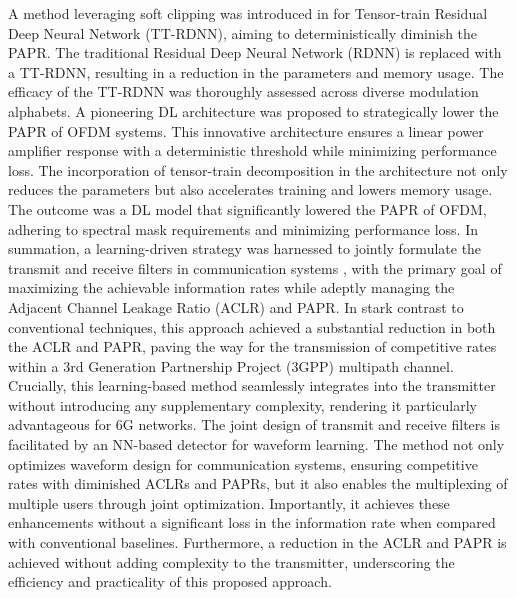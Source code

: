 \documentclass[conference]{IEEEtran}
\begin{document}
A method leveraging soft clipping was introduced in \cite{b153} for Tensor-train Residual Deep Neural Network (TT-RDNN), aiming to deterministically diminish the PAPR. The traditional Residual Deep Neural Network (RDNN) is replaced with a TT-RDNN, resulting in a reduction in the parameters and memory usage. The efficacy of the TT-RDNN was thoroughly assessed across diverse modulation alphabets. A pioneering DL architecture was proposed to strategically lower the PAPR of OFDM systems. This innovative architecture ensures a linear power amplifier response with a deterministic threshold while minimizing performance loss. The incorporation of tensor-train decomposition in the architecture not only reduces the parameters but also accelerates training and lowers memory usage. The outcome was a DL model that significantly lowered the PAPR of OFDM, adhering to spectral mask requirements and minimizing performance loss. In summation, a learning-driven strategy was harnessed to jointly formulate the transmit and receive filters in communication systems \cite{b154}, with the primary goal of maximizing the achievable information rates while adeptly managing the Adjacent Channel Leakage Ratio (ACLR) and PAPR. In stark contrast to conventional techniques, this approach achieved a substantial reduction in both the ACLR and PAPR, paving the way for the transmission of competitive rates within a 3rd Generation Partnership Project (3GPP) multipath channel. Crucially, this learning-based method seamlessly integrates into the transmitter without introducing any supplementary complexity, rendering it particularly advantageous for 6G networks. The joint design of transmit and receive filters is facilitated by an NN-based detector for waveform learning. The method not only optimizes waveform design for communication systems, ensuring competitive rates with diminished ACLRs and PAPRs, but it also enables the multiplexing of multiple users through joint optimization. Importantly, it achieves these enhancements without a significant loss in the information rate when compared with conventional baselines. Furthermore, a reduction in the ACLR and PAPR is achieved without adding complexity to the transmitter, underscoring the efficiency and practicality of this proposed approach.
\end{document}
